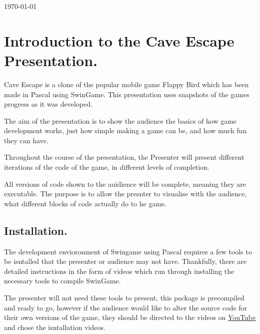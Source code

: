 \documentclass[12pt]{article}
\begin{document}
\begin{titlepage}
{\large \today}\\[3cm] %




\vfill %

\end{titlepage}

\section{Introduction to the Cave Escape Presentation.}
Cave Escape is a clone of the popular mobile game Flappy Bird which has been made in
Pascal using SwinGame. This presentation uses snapshots of the games progress as it was developed.

The aim of the presentation is to show the audience the basics of how game development works, just how simple making
a game can be, and how much fun they can have.

Throughout the course of the presentation, the Presenter will present different iterations of the code of the game, in different levels of completion.

All versions of code shown to the auidience will be complete, meaning they are executable. The purpose is to allow the presnter to visualise
with the audience, what different blocks of code actually do to he game.

\subsection{Installation.}
The development envioronment of Swingame using Pascal requires a few tools to be isntalled that the presenter or audience
may not have. Thankfully, there are detailed instructions in the form of videos which run through installing the necessary tools to compile SwinGame.

The presenter will not need these tools to present, this package is precompiled and ready to go, however if the audience would like to alter the source code
for their own versions of the game, they should be directed to the videos on
\href{https://www.youtube.com/playlist?list=PLdVESrjTNUXtU8zclRh9ovhstzWQAY05U}{\underline{YouTube}} and chose the isntallation videos.

\section{}
\end{document}
